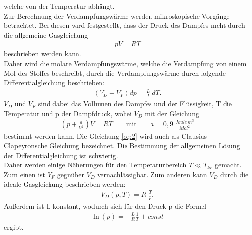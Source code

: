 welche von der Temperatur abhängt.\\
Zur Berechnung der Verdampfungswärme werden mikroskopische Vorgänge betrachtet. Bei diesen
wird festgestellt, dass der Druck des Dampfes nicht durch die allgemeine Gasgleichung
\begin{align}
    pV=RT \label{eq:1}
\end{align}
beschrieben werden kann. \\
Daher wird die molare Verdampfungswärme, welche die Verdampfung von einem Mol des Stoffes
beschreibt, durch die Verdampfungswärme durch folgende Differentialgleichung beschrieben:
\begin{align}
    \left(V_D - V_F\right)dp=\frac{L}{T} \; dT \label{eq:2}.
\end{align}
$V_D$ und $V_F$ sind dabei das Vollumen des Dampfes und der Flüssigkeit, T die Temperatur und p der Dampfdruck,
wobei $V_D$ mit der Gleichung
\begin{align}
    \left(p+\frac{a}{V^2}\right)V=RT \qquad \text{mit} \qquad a=0,9 \;\frac{Joule\,m^3}{Mol^2} \label{eq:3}
\end{align}
bestimmt werden kann.
Die Gleichung \eqref{eq:2} wird auch als Clausius-Clapeyronsche Gleichung bezeichnet.
Die Bestimmung der allgemeinen Lösung der Differentialgleichung ist schwierig. \\
Daher werden einige Näherungen für den Temperaturbereich $T \ll T_{kr}$ gemacht.
Zum einen ist $V_F$ gegnüber $V_D$ vernachlässigbar.
Zum anderen kann $V_D$ durch die ideale Gasgleichung beschrieben werden:
\begin{align}
    V_D(p,T)=R \; \frac{T}{p} \label{eq:4}.
\end{align}
Außerdem ist L konstant, wodurch sich für den Druck p die Formel
\begin{align}
    \ln(p)=- \frac{L}{R} \frac{1}{T}+const \label{eq:5}
\end{align}
ergibt.
\newpage


